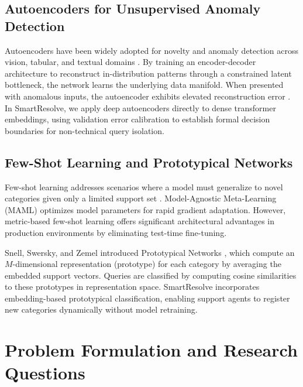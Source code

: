 \documentclass[conference]{IEEEtran}
\begin{document}
\subsection{Autoencoders for Unsupervised Anomaly Detection}
Autoencoders have been widely adopted for novelty and anomaly detection across vision, tabular, and textual domains \cite{bank2020}. By training an encoder-decoder architecture to reconstruct in-distribution patterns through a constrained latent bottleneck, the network learns the underlying data manifold. When presented with anomalous inputs, the autoencoder exhibits elevated reconstruction error \cite{sakurada2014, hawkins2002}. In SmartResolve, we apply deep autoencoders directly to dense transformer embeddings, using validation error calibration to establish formal decision boundaries for non-technical query isolation.

\subsection{Few-Shot Learning and Prototypical Networks}
Few-shot learning addresses scenarios where a model must generalize to novel categories given only a limited support set \cite{wang2020fewshot}. Model-Agnostic Meta-Learning (MAML) \cite{finn2017} optimizes model parameters for rapid gradient adaptation. However, metric-based few-shot learning offers significant architectural advantages in production environments by eliminating test-time fine-tuning.

Snell, Swersky, and Zemel introduced Prototypical Networks \cite{snell2017}, which compute an $M$-dimensional representation (prototype) for each category by averaging the embedded support vectors. Queries are classified by computing cosine similarities to these prototypes in representation space. SmartResolve incorporates embedding-based prototypical classification, enabling support agents to register new categories dynamically without model retraining.

\section{Problem Formulation and Research Questions}
\end{document}
